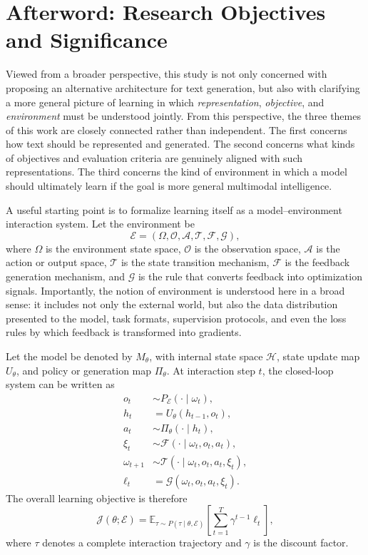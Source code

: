 \section{Afterword: Research Objectives and Significance}

Viewed from a broader perspective, this study is not only concerned with proposing an alternative architecture for text generation, but also with clarifying a more general picture of learning in which \emph{representation}, \emph{objective}, and \emph{environment} must be understood jointly. From this perspective, the three themes of this work are closely connected rather than independent. The first concerns how text should be represented and generated. The second concerns what kinds of objectives and evaluation criteria are genuinely aligned with such representations. The third concerns the kind of environment in which a model should ultimately learn if the goal is more general multimodal intelligence.

A useful starting point is to formalize learning itself as a model--environment interaction system. Let the environment be
\begin{equation}
\mathcal E = (\Omega, \mathcal O, \mathcal A, \mathcal T, \mathcal F, \mathcal G),
\label{eq:after_env}
\end{equation}
where $\Omega$ is the environment state space, $\mathcal O$ is the observation space, $\mathcal A$ is the action or output space, $\mathcal T$ is the state transition mechanism, $\mathcal F$ is the feedback generation mechanism, and $\mathcal G$ is the rule that converts feedback into optimization signals. Importantly, the notion of environment is understood here in a broad sense: it includes not only the external world, but also the data distribution presented to the model, task formats, supervision protocols, and even the loss rules by which feedback is transformed into gradients.

Let the model be denoted by $M_\theta$, with internal state space $\mathcal H$, state update map $U_\theta$, and policy or generation map $\Pi_\theta$. At interaction step $t$, the closed-loop system can be written as
\begin{align}
o_t &\sim P_{\mathcal E}(\cdot \mid \omega_t), \\
h_t &= U_\theta(h_{t-1}, o_t), \\
a_t &\sim \Pi_\theta(\cdot \mid h_t), \\
\xi_t &\sim \mathcal F(\cdot \mid \omega_t, o_t, a_t), \\
\omega_{t+1} &\sim \mathcal T(\cdot \mid \omega_t, o_t, a_t, \xi_t), \\
\ell_t &= \mathcal G(\omega_t, o_t, a_t, \xi_t).
\end{align}
The overall learning objective is therefore
\begin{equation}
\mathcal J(\theta; \mathcal E)
=
\mathbb E_{\tau \sim P(\tau \mid \theta, \mathcal E)}
\left[
\sum_{t=1}^{T} \gamma^{t-1} \ell_t
\right],
\label{eq:after_general_objective}
\end{equation}
where $\tau$ denotes a complete interaction trajectory and $\gamma$ is the discount factor.

